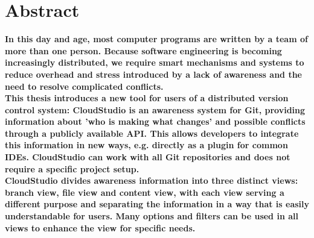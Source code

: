 


\chapter*{Abstract}

\textbf{In this day and age, most computer programs are written by a team of more than one person. Because software engineering is becoming increasingly distributed, we require smart mechanisms and systems to reduce overhead and stress introduced by a lack of awareness and the need to resolve complicated conflicts.} \\

\textbf{This thesis introduces a new tool for users of a distributed version control system: CloudStudio is an awareness system for Git, providing information about 'who is making what changes' and possible conflicts through a publicly available API. This allows developers to integrate this information in new ways, e.g. directly as a plugin for common IDEs. CloudStudio can work with all Git repositories and does not require a specific project setup.} \\

\textbf{CloudStudio divides awareness information into three distinct views: branch view, file view and content view, with each view serving a different purpose and separating the information in a way that is easily understandable for users. Many options and filters can be used in all views to enhance the view for specific needs.}


